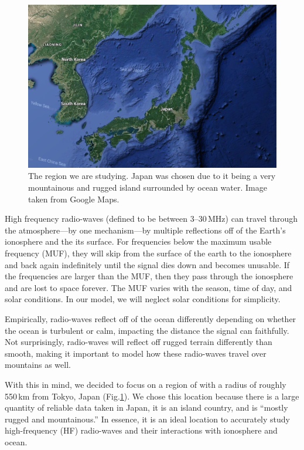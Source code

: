 \documentclass[11pt]{article}
\numberwithin{equation}{section}
\begin{document}
 \begin{figure}[ht]
 \begin{center}
     \includegraphics[width = 4.55in]{figs/japan.png}
 \end{center}
 \caption{The region we are studying. Japan was chosen due to it being a very mountainous and rugged island surrounded by ocean water. Image taken from Google Maps.}
 \label{fig:jap} 
\end{figure} 

High frequency radio-waves (defined to be between 3--30\,\si{\mega\hertz}) can travel through the atmosphere---by one mechanism---by multiple reflections off of the Earth's ionosphere and the its surface. For frequencies below the maximum usable frequency (MUF), they will skip from the surface of the earth to the ionosphere and back again indefinitely until the signal dies down and becomes unusable. If the frequencies are larger than the MUF, then they pass through the ionosphere and are lost to space forever. The MUF varies with the season, time of day, and solar conditions.\cite{mcm_statement} In our model, we will neglect solar conditions for simplicity.


Empirically, radio-waves reflect off of the ocean differently depending on whether the ocean is turbulent or calm, impacting the distance the signal can faithfully.\cite{mcm_statement} Not surprisingly, radio-waves will reflect off rugged terrain differently than smooth, making it important to model how these radio-waves travel over mountains as well.

With this in mind, we decided to focus on a region of with a radius of roughly 550\,\si{\km} from Tokyo, Japan (Fig.\ref{fig:jap}). We chose this location because there is a large quantity of reliable data taken in Japan, it is an island country, and is ``mostly rugged and mountainous.''\cite{factbook2010world} In essence, it is an ideal location to accurately study high-frequency (HF) radio-waves and their interactions with ionosphere and ocean.
\end{document}
